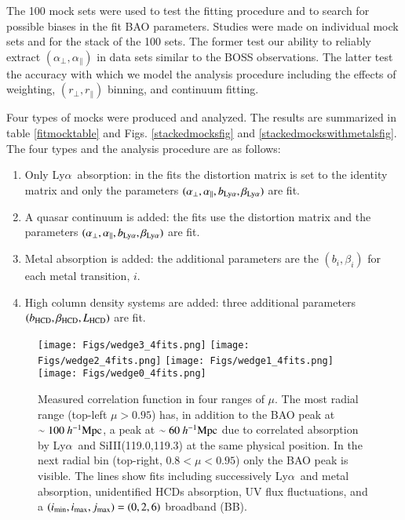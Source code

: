 \documentclass{aa}
\newcommand{\imin}{i_{\rm min}}
\newcommand{\imax}{i_{\rm max}}
\newcommand{\jmax}{j_{\rm max}}
\newcommand{\apar}{\alpha_\parallel}
\newcommand{\aperp}{\alpha_\perp}
\newcommand{\hMpc}{h^{-1}{\rm Mpc}}
\newcommand{\Lya}{Ly$\alpha$~}
\newcommand{\rperp}{r_\perp}
\newcommand{\rpar}{r_\parallel}
\newcommand{\betalya}{\beta_{\rm Ly\alpha}}
\newcommand{\blya}{b_{\rm Ly\alpha}}
\newcommand{\betahcds}{\beta_{\rm HCD}}
\newcommand{\bhcds}{b_{\rm HCD}}
\newcommand{\Lhcds}{L_{\rm HCD}}
\begin{document}
The 100 mock sets were used to test the fitting procedure and to 
search for possible biases in the fit BAO parameters.
Studies were made on individual mock sets and for the
stack of the 100 sets.  The former test our ability
to reliably extract $(\aperp,\apar)$ in data sets similar
to the BOSS observations.  The latter test the accuracy with
which we model  the analysis procedure including the effects of  weighting,
$(\rperp,\rpar)$ binning, and continuum fitting.



Four types of mocks
were produced and analyzed.  The results are summarized in
table \ref{fitmocktable} and Figs.
\ref{stackedmocksfig} and \ref{stackedmockswithmetalsfig}.
The four types
and the analysis procedure are as follows:
\begin{enumerate}
\item Only \Lya absorption:  in the fits
  the distortion matrix is set  to the identity matrix and
  only the parameters $(\aperp,\apar,\blya, \betalya)$ are fit.
\item A quasar continuum is added:  the
  fits use the distortion matrix and 
  the parameters $(\aperp,\apar,\blya, \betalya)$ are fit.
\item Metal absorption is added: the
  additional parameters are the $(b_i,\beta_i)$ for each metal transition, $i$.
\item High column density systems are added:
  three additional parameters $(\bhcds,\betahcds,\Lhcds)$ are fit.
\end{enumerate}





\begin{figure*}[ht]
\centering
\texttt{[image: Figs/wedge3\_4fits.png]}
\texttt{[image: Figs/wedge2\_4fits.png]}
\texttt{[image: Figs/wedge1\_4fits.png]}
\texttt{[image: Figs/wedge0\_4fits.png]}
\caption{Measured correlation function
in four ranges of $\mu$.  The most radial range (top-left $\mu>0.95$) 
has, in addition to the BAO peak at $\sim100~\hMpc$,
a peak at $\sim60~\hMpc$ due to correlated absorption by
\Lya and SiIII(119.0,119.3) at the same physical position.
In the next radial bin (top-right, $0.8<\mu<0.95$) only the BAO
peak is visible.
The lines show fits including successively \Lya and metal absorption,
unidentified HCDs absorption,  UV flux fluctuations, and
a $(\imin,\imax,\jmax)=(0,2,6)$ broadband (BB).
}
\label{wedgesfig}
\end{figure*}
\end{document}
